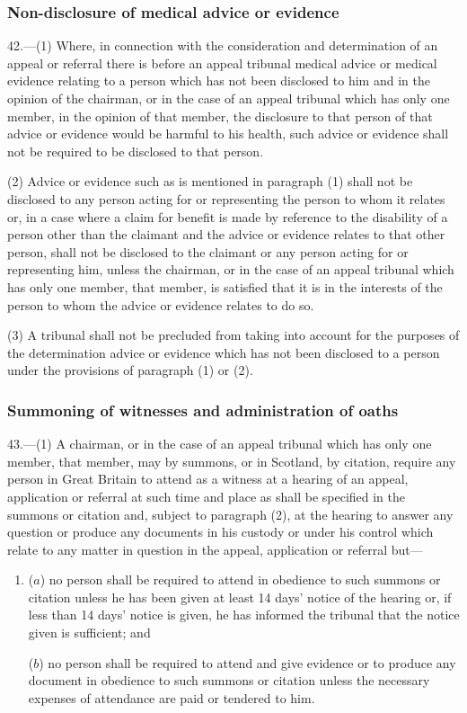 \documentclass[12pt,a4paper]{article}
\begin{document}
\subsubsection[42. Non-disclosure of medical advice or evidence]{Non-disclosure of medical advice or evidence}

42.—(1) Where, in connection with the consideration and determination of an appeal or referral there is before an appeal tribunal medical advice or medical evidence relating to a person which has not been disclosed to him and in the opinion of the chairman, or in the case of an appeal tribunal which has only one member, in the opinion of that member, the disclosure to that person of that advice or evidence would be harmful to his health, such advice or evidence shall not be required to be disclosed to that person.

(2) Advice or evidence such as is mentioned in paragraph (1) shall not be disclosed to any person acting for or representing the person to whom it relates or, in a case where a claim for benefit is made by reference to the disability of a person other than the claimant and the advice or evidence relates to that other person, shall not be disclosed to the claimant or any person acting for or representing him, unless the chairman, or in the case of an appeal tribunal which has only one member, that member, is satisfied that it is in the interests of the person to whom the advice or evidence relates to do so.

(3) A tribunal shall not be precluded from taking into account for the purposes of the determination advice or evidence which has not been disclosed to a person under the provisions of paragraph (1) or (2).

\subsubsection[43. Summoning of witnesses and administration of oaths]{Summoning of witnesses and administration of oaths}

43.—(1) A chairman, or in the case of an appeal tribunal which has only one member, that member, may by summons, or in Scotland, by citation, require any person in Great Britain to attend as a witness at a hearing of an appeal, application or referral at such time and place as shall be specified in the summons or citation and, subject to paragraph (2), at the hearing to answer any question or produce any documents in his custody or under his control which relate to any matter in question in the appeal, application or referral but—
\begin{enumerate}\item[]
($a$) no person shall be required to attend in obedience to such summons or citation unless he has been given at least 14 days' notice of the hearing or, if less than 14 days' notice is given, he has informed the tribunal that the notice given is sufficient; and

($b$) no person shall be required to attend and give evidence or to produce any document in obedience to such summons or citation unless the necessary expenses of attendance are paid or tendered to him.
\end{enumerate}
\end{document}
